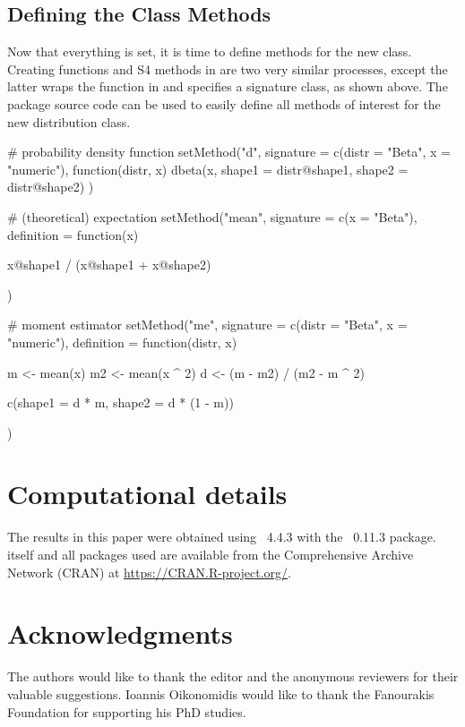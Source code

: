 \documentclass[nojss]{jss}
\newcommand{\fct}[1]{\code{#1()}}
\begin{document}
\subsection[Defining the Class Methods]{Defining the Class Methods}

Now that everything is set, it is time to define methods for the new class. Creating functions and S4 methods in  are two very similar processes, except the latter wraps the function in \fct{setMethod} and specifies a signature class, as shown above. The package source code can be used to easily define all methods of interest for the new distribution class.

\begin{CodeChunk}
\begin{CodeInput}
# probability density function
setMethod("d", signature = c(distr = "Beta", x = "numeric"),
          function(distr, x) {
            dbeta(x, shape1 = distr@shape1, shape2 = distr@shape2)
          })

# (theoretical) expectation
setMethod("mean",
          signature  = c(x = "Beta"),
          definition = function(x) {

  x@shape1 / (x@shape1 + x@shape2)

})

# moment estimator
setMethod("me",
          signature  = c(distr = "Beta", x = "numeric"),
          definition = function(distr, x) {

  m  <- mean(x)
  m2 <- mean(x ^ 2)
  d  <- (m - m2) / (m2 - m ^ 2)

  c(shape1 = d * m, shape2 = d * (1 - m))

})
\end{CodeInput}
\end{CodeChunk}

\section*{Computational details}

The results in this paper were obtained using
~4.4.3 with the
~0.11.3 package.  itself
and all packages used are available from the Comprehensive
 Archive Network (CRAN) at
\url{https://CRAN.R-project.org/}.

\section*{Acknowledgments}

\begin{leftbar}
The authors would like to thank the editor and the anonymous reviewers for their valuable suggestions. Ioannis Oikonomidis would like to thank the Fanourakis Foundation for supporting his PhD studies.
\end{leftbar}



\end{document}
